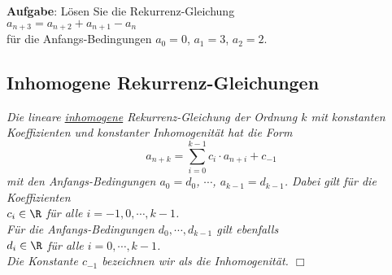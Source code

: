 \noindent
\textbf{Aufgabe}: L\"osen Sie die Rekurrenz-Gleichung \\[0.1cm]
\hspace*{1.3cm} $a_{n+3} = a_{n+2} + a_{n+1} - a_n$ \\[0.1cm]
f\"ur die Anfangs-Bedingungen $a_0 = 0$, $a_1 = 3$, $a_2 = 2$.


\subsection{Inhomogene Rekurrenz-Gleichungen}    
\begin{Definition}
{\em Die \emph{lineare \underline{inhomo}g\underline{ene} Rekur\-renz-Gleichung der Ordnung
$k$ mit konstanten Koeffizienten und konstanter Inhomogenit\"at} hat die Form 
\begin{equation}
  \label{eq:lihrg}
     a_{n+k} = \sum\limits_{i=0}^{k-1} c_{i} \cdot a_{n+i} + c_{-1}  
\end{equation}
     mit den Anfangs-Bedingungen $a_0 = d_0$, $\cdots$, $a_{k-1} = d_{k-1}$. 
     Dabei gilt f\"ur die Koeffizienten \\[0.1cm]
     \hspace*{1.3cm} $c_i \in \R$ \quad f\"ur alle $i = -1, 0,\cdots, k-1$. \\[0.1cm]
     F\"ur die  \emph{Anfangs-Bedingungen} $d_0, \cdots, d_{k-1}$ gilt ebenfalls \\[0.1cm]
     \hspace*{1.3cm} $d_i \in \R$ \quad f\"ur alle $i = 0,\cdots, k-1$. \\[0.1cm]
     Die Konstante $c_{-1}$ bezeichnen wir als die \emph{Inhomogenit\"at}. 
     \hspace*{\fill} $\Box$
}
\end{Definition}

